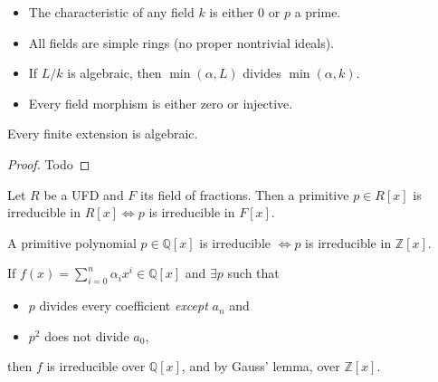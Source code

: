 \begin{itemize}
\tightlist
\item
  The characteristic of any field \(k\) is either 0 or \(p\) a prime.
\item
  All fields are simple rings (no proper nontrivial ideals).
\item
  If \(L/k\) is algebraic, then \(\min(\alpha, L)\) divides
  \(\min(\alpha, k)\).
\item
  Every field morphism is either zero or injective.
\end{itemize}

\begin{theorem}

Every finite extension is algebraic.

\end{theorem}

\begin{proof}

Todo

\end{proof}

\begin{theorem}

Let \(R\) be a UFD and \(F\) its field of fractions. Then a primitive
\(p\in R[x]\) is irreducible in \(R[x] \iff p\) is irreducible in
\(F[x]\).

\end{theorem}

\begin{corollary}

A primitive polynomial \(p\in {\mathbb{Q}}[x]\) is irreducible
\(\iff p\) is irreducible in \({\mathbb{Z}}[x]\).

\end{corollary}

\begin{theorem}

If \(f(x) = \sum_{i=0}^n \alpha_i x^i \in {\mathbb{Q}}[x]\) and
\(\exists p\) such that

\begin{itemize}
\tightlist
\item
  \(p\) divides every coefficient \emph{except} \(a_n\) and
\item
  \(p^2\) does not divide \(a_0\),
\end{itemize}

then \(f\) is irreducible over \({\mathbb{Q}}[x]\), and by Gauss' lemma,
over \({\mathbb{Z}}[x]\).

\end{theorem}

